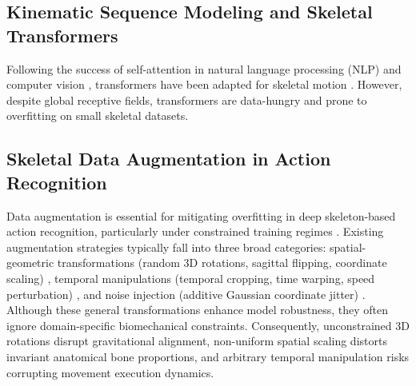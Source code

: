 \documentclass[preprint,12pt]{elsarticle}
\newcommand{\rv}[1]{{\color{red}#1}}
\begin{document}
\subsection{Kinematic Sequence Modeling and Skeletal Transformers}
Following the success of self-attention in natural language processing (NLP) and computer vision \cite{vaswani2017,arnab2021,bertasius2021,liu2022video}, transformers have been adapted for skeletal motion \cite{plizzari2021sttr}. %
However, despite global receptive fields, transformers are data-hungry and prone to overfitting on small skeletal datasets. %

\subsection{Skeletal Data Augmentation in Action Recognition}

Data augmentation is essential for mitigating overfitting in deep skeleton-based action recognition, particularly under constrained training regimes \cite{yan2018,shi2020skeleton}.
Existing augmentation strategies typically fall into three broad categories: spatial-geometric transformations (random 3D rotations, sagittal flipping, coordinate scaling) \rv{\cite{}}, temporal manipulations (temporal cropping, time warping, speed perturbation) \rv{\cite{}}, and noise injection (additive Gaussian coordinate jitter) \cite{xin2024augmentation}.
Although these general transformations enhance model robustness, they often ignore domain-specific biomechanical constraints. 
Consequently, unconstrained 3D rotations disrupt gravitational alignment, non-uniform spatial scaling distorts invariant anatomical bone proportions, and arbitrary temporal manipulation risks corrupting movement execution dynamics.
\end{document}
